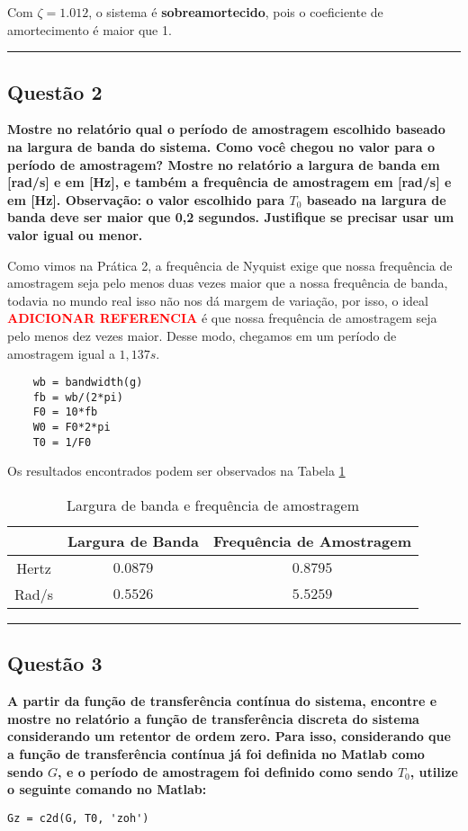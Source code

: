    Com \( \zeta = 1.012 \), o sistema é \textbf{sobreamortecido}, pois o coeficiente de amortecimento é maior que 1.

\vspace{10pt}
\hrule

\subsection{Questão 2}
\textbf{Mostre no relatório qual o período de amostragem escolhido baseado na largura de banda do sistema. Como você chegou no valor para o período de amostragem? Mostre no relatório a largura de banda em [rad/s] e em [Hz], e também a frequência de amostragem em [rad/s] e em [Hz]. Observação: o valor escolhido para \( T_0 \) baseado na largura de banda deve ser maior que 0,2 segundos. Justifique se precisar usar um valor igual ou menor.}

Como vimos na Prática 2, a frequência de Nyquist exige que nossa frequência de amostragem seja pelo menos duas vezes maior que a nossa frequência de banda, todavia no mundo real isso não nos dá margem de variação, por isso, o ideal \textcolor{red}{\textbf{ADICIONAR REFERENCIA}} é que nossa frequência de amostragem seja pelo menos dez vezes maior. Desse modo, chegamos em um período de amostragem igual a $1,137s$.

\begin{verbatim}
    wb = bandwidth(g)
    fb = wb/(2*pi)
    F0 = 10*fb
    W0 = F0*2*pi
    T0 = 1/F0
\end{verbatim}

Os resultados encontrados podem ser observados na Tabela \ref{tab:wb-fb-F0-W0}

\begin{table}[H]
    \centering
    \begin{tabular}{|c|c|c|} \hline 
         &Largura de Banda&  Frequência de Amostragem\\ \hline  
         Hertz&  $0.0879$&  $0.8795$\\ \hline  
         Rad/s&  $0.5526$ &  $5.5259$\\ \hline 
    \end{tabular}
    \caption{Largura de banda e frequência de amostragem}
    \label{tab:wb-fb-F0-W0}
\end{table}

\vspace{10pt}
\hrule

\subsection{Questão 3}
\textbf{A partir da função de transferência contínua do sistema, encontre e mostre no relatório a função de transferência discreta do sistema considerando um retentor de ordem zero. Para isso, considerando que a função de transferência contínua já foi definida no Matlab como sendo \( G \), e o período de amostragem foi definido como sendo \( T_0 \), utilize o seguinte comando no Matlab:}
\begin{verbatim}
Gz = c2d(G, T0, 'zoh')
\end{verbatim}

